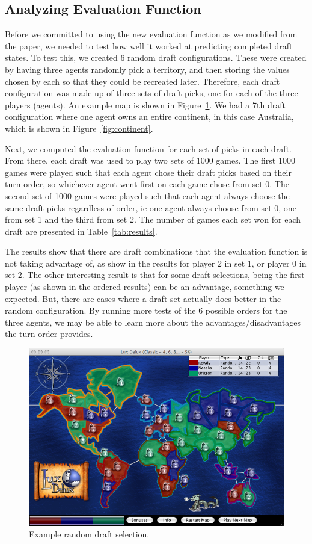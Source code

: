 \documentclass[letterpaper]{article}
\numberwithin{equation}{section}
\numberwithin{theorem}{section}
\numberwithin{lemma}{section}
\numberwithin{df}{section}
\begin{document}
\subsection{Analyzing Evaluation Function}

Before we committed to using the new evaluation function as we modified from the paper, we needed to test how well it worked at predicting completed draft states. To test this, we created 6 random draft configurations. These were created by having three agents randomly pick a territory, and then storing the values chosen by each so that they could be recreated later. Therefore, each draft configuration was made up of three sets of draft picks, one for each of the three players (agents). An example map is shown in Figure~\ref{fig:random}. We had a 7th draft configuration where one agent owns an entire continent, in this case Australia, which is shown in Figure~\ref{fig:continent}. 

Next, we computed the evaluation function for each set of picks in each draft. From there, each draft was used to play two sets of 1000 games. The first 1000 games were played such that each agent chose their draft picks based on their turn order, so whichever agent went first on each game chose from set 0. The second set of 1000 games were played such that each agent always choose the same draft picks regardless of order, ie one agent always choose from set 0, one from set 1 and the third from set 2. The number of games each set won for each draft are presented in Table~\ref{tab:results}.

The results show that there are draft combinations that the evaluation function is not taking advantage of, as show in the results for player 2 in set 1, or player 0 in set 2. The other interesting result is that for some draft selections, being the first player (as shown in the ordered results) can be an advantage, something we expected. But, there are cases where a draft set actually does better in the random configuration. By running more tests of the 6 possible orders for the three agents, we may be able to learn more about the advantages/disadvantages the turn order provides. 

\begin{figure}[htp]
\centering
\includegraphics[scale=0.3]{testmap2.png}
\caption{Example random draft selection.}\label{fig:random}
\end{figure}
\end{document}
